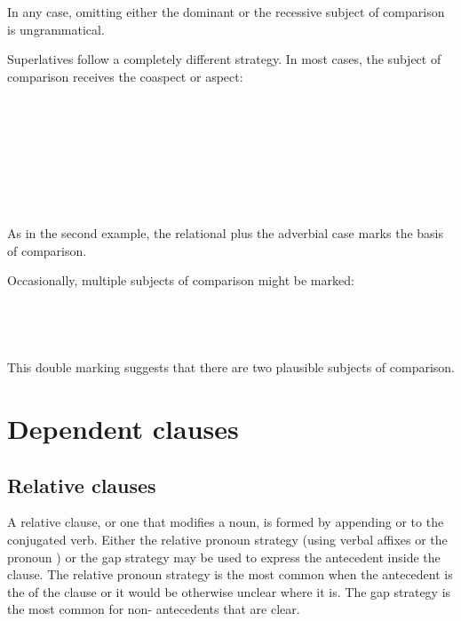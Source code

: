 \documentclass{book}
\begin{document}
In any case, omitting either the dominant or the recessive subject of comparison is ungrammatical.

Superlatives follow a completely different strategy. In most cases, the subject of comparison receives the  coaspect or aspect: \\
~\\
    \\
    \\
    \\
~\\
   \\
   \\
   \\

As in the second example, the relational  plus the adverbial case marks the basis of comparison.

Occasionally, multiple subjects of comparison might be marked: \\
~\\
   \\
   \\
   \\

This double marking suggests that there are two plausible subjects of comparison.

\section{Dependent clauses}

\subsection{Relative clauses}

A relative clause, or one that modifies a noun, is formed by appending  or  to the conjugated verb. Either the relative pronoun strategy (using verbal affixes or the pronoun ) or the gap strategy may be used to express the antecedent inside the clause. The relative pronoun strategy is the most common when the antecedent is the  of the clause or it would be otherwise unclear where it is. The gap strategy is the most common for non- antecedents that are clear.
\end{document}
